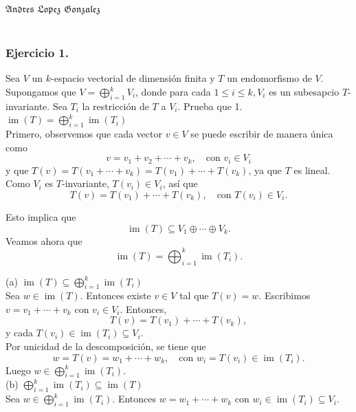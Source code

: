 \documentclass{article}
\theoremstyle{nonumberplain}
\begin{document}
\hspace{12cm}$\mathfrak{Andres \,\, Lopez \,\, Gonzalez}$\\\\

\subsubsection*{Ejercicio 1.} Sea \( V \) un \( k \)-espacio vectorial de dimensión finita y \( T \) un endomorfismo de \( V \). Supongamos que \( V=\bigoplus_{i=1}^{k} V_{i} \), donde para cada \( 1 \leq i \leq k, V_{i} \) es un subesapcio \( T \)-invariante. Sea \( T_{i} \) la restricción de \( T \) a \( V_{i} \). Prueba que
1. \( \operatorname{im}(T)=\bigoplus_{i=1}^{k} \operatorname{im}\left(T_{i}\right) \) \\
Primero, observemos que cada vector \( v \in V \) se puede escribir de manera única como
\[
v = v_1 + v_2 + \cdots + v_k, \quad \text{con } v_i \in V_i
\]
y que \( T(v) = T(v_1 + \cdots + v_k) = T(v_1) + \cdots + T(v_k) \), ya que \( T \) es lineal. \\

Como \( V_i \) es \( T \)-invariante, \( T(v_i) \in V_i \), así que
\[
T(v) = T(v_1) + \cdots + T(v_k), \quad \text{con } T(v_i) \in V_i.
\]

Esto implica que
\[
\operatorname{im}(T) \subseteq V_1 \oplus \cdots \oplus V_k.
\]
Veamos ahora que
\[
\operatorname{im}(T) = \bigoplus_{i=1}^k \operatorname{im}(T_i).
\]

 (a) \( \operatorname{im}(T) \subseteq \bigoplus_{i=1}^k \operatorname{im}(T_i) \) \\
Sea \( w \in \operatorname{im}(T) \). Entonces existe \( v \in V \) tal que \( T(v) = w \). Escribimos \( v = v_1 + \cdots + v_k \) con \( v_i \in V_i \). Entonces,
\[
T(v) = T(v_1) + \cdots + T(v_k),
\]
y cada \( T(v_i) \in \operatorname{im}(T_i) \subseteq V_i \). \\

Por unicidad de la descomposición, se tiene que
\[
w = T(v) = w_1 + \cdots + w_k, \quad \text{con } w_i = T(v_i) \in \operatorname{im}(T_i).
\]
Luego \( w \in \bigoplus_{i=1}^k \operatorname{im}(T_i) \). \\

 (b) \( \bigoplus_{i=1}^k \operatorname{im}(T_i) \subseteq \operatorname{im}(T) \) \\
Sea \( w \in \bigoplus_{i=1}^k \operatorname{im}(T_i) \). Entonces \( w = w_1 + \cdots + w_k \) con \( w_i \in \operatorname{im}(T_i) \subseteq V_i \). \\
\end{document}
